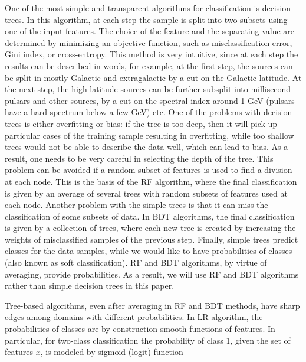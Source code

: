 One of the most simple and transparent algorithms for classification is decision trees.
In this algorithm, at each step the sample is split into two subsets using one of the input features.
The choice of the feature and the separating value are determined by minimizing an objective function, such as misclassification
error, Gini index, or cross-entropy.
This method is very intuitive, since at each step the results can be described in words, 
for example, at the first step, the sources can be split in mostly Galactic and extragalactic by a cut on the Galactic latitude.
At the next step, the high latitude sources can be further subsplit into millisecond pulsars and other sources, by a cut on the spectral index around 1 GeV (pulsars have a hard spectrum below a few GeV) etc.
One of the problems with decision trees is either overfitting or bias: if the tree is too deep, then it will pick up particular cases of the training sample resulting in overfitting, while too shallow trees would not be able to describe the data well, which can lead to bias. 
As a result, one needs to be very careful in selecting the depth of the tree.
This problem can be avoided if a random subset of features is used to find a division at each node. This is the basis of the RF algorithm,
where the final classification is given by an average of several trees with random subsets of features used at each node.
Another problem with the simple trees is that it can miss the classification of some subsets of data. In BDT algorithms, the final classification is given by a collection of trees, where each new tree is created by increasing the weights of misclassified samples of the previous step. 
Finally, simple trees predict classes for the data samples, while we would like to have probabilities of classes (also known as soft classification).
RF and BDT algorithms, by virtue of averaging, provide probabilities. As a result, we will use RF and BDT algorithms rather than simple decision trees in this paper.

Tree-based algorithms, even after averaging in RF and BDT methods, have sharp edges among domains with different probabilities.
In LR algorithm, the probabilities of classes are by construction smooth functions of features.
In particular, for two-class classification the probability of class 1, given the set of features $x$, is modeled by sigmoid (logit) function

